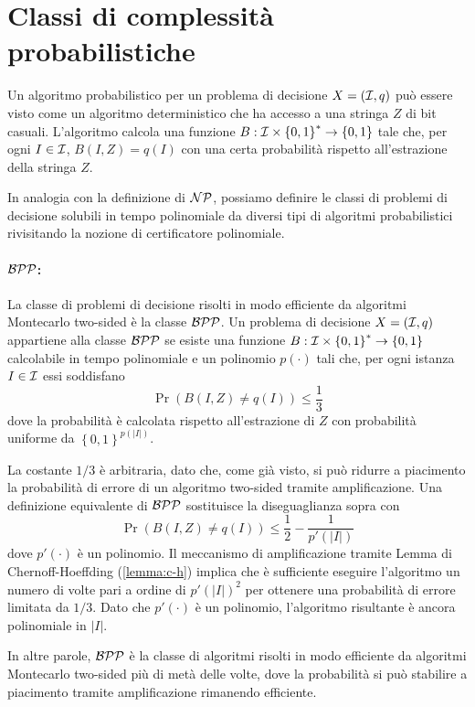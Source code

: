 \section{Classi di complessità probabilistiche}

Un algoritmo probabilistico per un problema di decisione $X = (\mathcal{I}, q)$ può essere visto come un algoritmo deterministico che ha accesso a una stringa $Z$ di bit casuali. L'algoritmo calcola una funzione $B: \mathcal{I} \times \left\{0,1\right\}^\ast \rightarrow \left\{0,1\right\}$ tale che, per ogni $I \in \mathcal{I}$, $B(I, Z) = q(I)$ con una certa probabilità rispetto all'estrazione della stringa $Z$.

In analogia con la definizione di $\mathcal{NP}$, possiamo definire le classi di problemi di decisione solubili in tempo polinomiale da diversi tipi di algoritmi probabilistici rivisitando la nozione di certificatore polinomiale.

\paragraph{$\mathcal{BPP}$:} La classe di problemi di decisione risolti in modo efficiente da algoritmi Montecarlo two-sided è la classe $\mathcal{BPP}$. Un problema di decisione $X = (\mathcal{I}, q)$ appartiene alla classe $\mathcal{BPP}$ se esiste una funzione $B: \mathcal{I} \times \left\{0,1\right\}^\ast \rightarrow \left\{0,1\right\}$ calcolabile in tempo polinomiale e un polinomio $p(\cdot)$ tali che, per ogni istanza $I \in \mathcal{I}$ essi soddisfano
$$ \Pr \left( B(I,Z) \neq q(I)\right) \leq \frac{1}{3}$$
dove la probabilità è calcolata rispetto all'estrazione di $Z$ con probabilità uniforme da $\left\{0,1\right\}^{p(|I|)}$.

La costante $1/3$ è arbitraria, dato che, come già visto, si può ridurre a piacimento la probabilità di errore di un algoritmo two-sided tramite amplificazione. Una definizione equivalente di $\mathcal{BPP}$ sostituisce la diseguaglianza sopra con
$$ \Pr \left(B(I, Z) \neq q(I)\right) \leq \frac{1}{2} - \frac{1}{p'(|I|)}$$
dove $p'(\cdot)$ è un polinomio. Il meccanismo di amplificazione tramite Lemma di Chernoff-Hoeffding (\ref{lemma:c-h}) implica che è sufficiente eseguire l'algoritmo un numero di volte pari a ordine di $p'(|I|)^2$ per ottenere una probabilità di errore limitata da $1/3$. Dato che $p'(\cdot)$ è un polinomio, l'algoritmo risultante è ancora polinomiale in $|I|$.

In altre parole, $\mathcal{BPP}$ è la classe di algoritmi risolti in modo efficiente da algoritmi Montecarlo two-sided più di metà delle volte, dove la probabilità si può stabilire a piacimento tramite amplificazione rimanendo efficiente.

